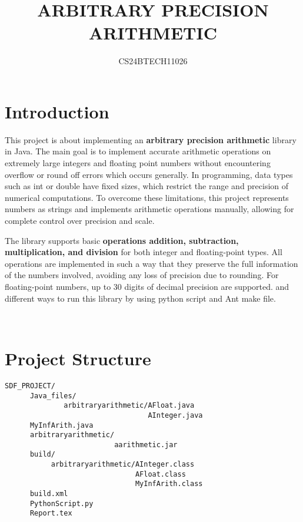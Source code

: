 \documentclass{article}
\title{ARBITRARY PRECISION ARITHMETIC}
\author{CS24BTECH11026}
\begin{document}
\maketitle


\section*{Introduction}

This project is about implementing an \textbf{arbitrary precision arithmetic} library in Java. The main goal is to implement accurate arithmetic operations on extremely large integers and floating point numbers without encountering overflow or round off errors which occurs generally. In programming, data types such as int or double have fixed sizes, which restrict the range and precision of numerical computations. To overcome these limitations, this project represents numbers as strings and implements arithmetic operations manually, allowing for complete control over precision and scale.
\newline

The library supports basic \textbf{operations addition, subtraction, multiplication, and division} for both integer and floating-point types. All operations are implemented in such a way that they preserve the full information of the numbers involved, avoiding any loss of precision due to rounding. For floating-point numbers, up to 30 digits of decimal precision are supported. and different ways to run this library by using python script and Ant make file.




\

\section*{Project Structure}
\begin{verbatim}
SDF_PROJECT/
      Java_files/                             
              arbitraryarithmetic/AFloat.java
                                  AInteger.java
      MyInfArith.java 
      arbitraryarithmetic/                    
                          aarithmetic.jar                  
      build/                                  
           arbitraryarithmetic/AInteger.class
                               AFloat.class
                               MyInfArith.class                        
      build.xml    
      PythonScript.py
      Report.tex
      
                            
\end{verbatim}
\end{document}

